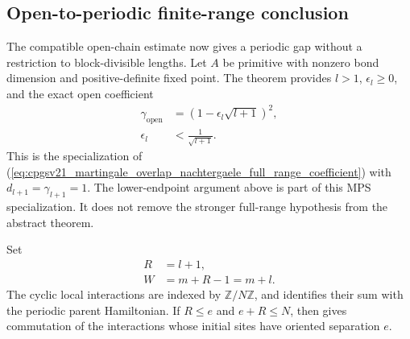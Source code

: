 \documentclass{article}
\begin{document}
\subsection{Open-to-periodic finite-range conclusion}

The compatible open-chain estimate now gives a periodic gap without a
restriction to block-divisible lengths.  Let $A$ be primitive with nonzero
bond dimension and positive-definite fixed point.  The theorem
provides $l>1$, $\epsilon_l\geq0$, and the exact open coefficient
\begin{align}
    \gamma_{\mathrm{open}}
     & =\left(1-\epsilon_l\sqrt{l+1}\right)^2,
    \label{eq:cpgsv21_martingale_overlap_open_knabe_coefficient} \\
    \epsilon_l
     & <\frac{1}{\sqrt{l+1}}.
    \label{eq:cpgsv21_martingale_overlap_open_knabe_threshold}
\end{align}
This is the specialization of
(\ref{eq:cpgsv21_martingale_overlap_nachtergaele_full_range_coefficient})
with $d_{l+1}=\gamma_{l+1}=1$.  The lower-endpoint argument above is part of
this MPS specialization.  It does not remove the stronger full-range
hypothesis from the abstract theorem.

Set
\begin{align}
    R & =l+1,
    \label{eq:cpgsv21_martingale_overlap_open_knabe_range} \\
    W & =m+R-1=m+l.
    \label{eq:cpgsv21_martingale_overlap_open_knabe_volume}
\end{align}
The cyclic local interactions are indexed by $\mathbb Z/N\mathbb Z$, and
 identifies their
sum with the periodic parent Hamiltonian.  If $R\leq e$ and $e+R\leq N$, then
 gives
commutation of the interactions whose initial sites have oriented separation
$e$.
\end{document}
